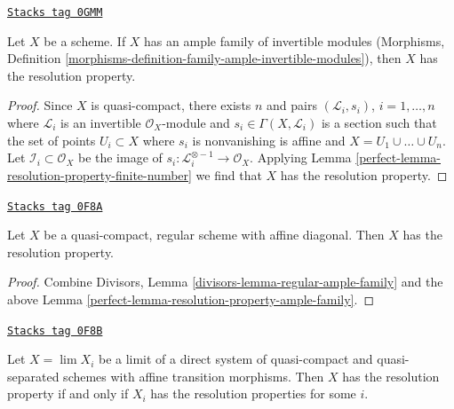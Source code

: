 \begin{lemma}
\label{perfect-lemma-resolution-property-ample-family}
\href{https://stacks.math.columbia.edu/tag/0GMM}{\texttt{Stacks tag 0GMM}}

Let $X$ be a scheme. If $X$ has an ample family of invertible modules
(Morphisms, Definition
\ref{morphisms-definition-family-ample-invertible-modules}),
then $X$ has the resolution property.
\end{lemma}

\begin{proof}

Since $X$ is quasi-compact, there exists $n$ and pairs
$(\mathcal{L}_i, s_i)$, $i = 1, \ldots, n$ where
$\mathcal{L}_i$ is an invertible $\mathcal{O}_X$-module and
$s_i \in \Gamma(X, \mathcal{L}_i)$ is a section
such that the set of points $U_i \subset X$ where $s_i$ is nonvanishing
is affine and $X = U_1 \cup \ldots \cup U_n$.
Let $\mathcal{I}_i \subset \mathcal{O}_X$ be the image
of $s_i : \mathcal{L}_i^{\otimes -1} \to \mathcal{O}_X$.
Applying Lemma \ref{perfect-lemma-resolution-property-finite-number}
we find that $X$ has the resolution property.
\end{proof}

\begin{lemma}
\label{perfect-lemma-regular-resolution-property}
\href{https://stacks.math.columbia.edu/tag/0F8A}{\texttt{Stacks tag 0F8A}}

Let $X$ be a quasi-compact, regular scheme with affine diagonal.
Then $X$ has the resolution property.
\end{lemma}

\begin{proof}

Combine Divisors, Lemma \ref{divisors-lemma-regular-ample-family} and the above
Lemma \ref{perfect-lemma-resolution-property-ample-family}.
\end{proof}

\begin{lemma}
\label{perfect-lemma-resolution-property-descends}
\href{https://stacks.math.columbia.edu/tag/0F8B}{\texttt{Stacks tag 0F8B}}

Let $X = \lim X_i$ be a limit of a direct system of quasi-compact
and quasi-separated schemes with affine transition morphisms.
Then $X$ has the resolution property if and only if $X_i$ has
the resolution properties for some $i$.
\end{lemma}

